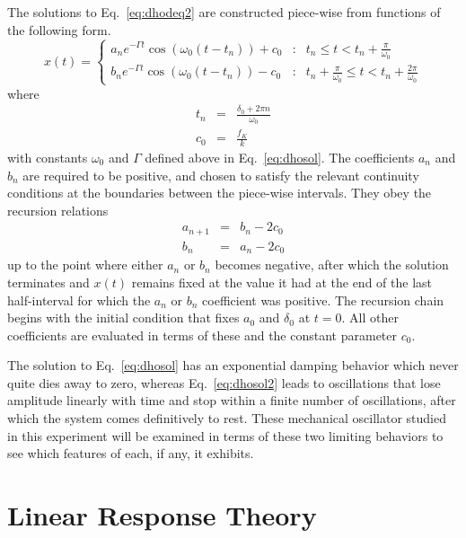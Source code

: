 \documentclass{revtex4}
\begin{document}
The solutions to Eq.~\ref{eq:dhodeq2} are constructed piece-wise from 
functions of the following form.
\begin{equation}
x(t)=\left\{\begin{array}{lll}
a_n e^{-\Gamma t} \cos\left(\omega_0 (t-t_n)\right) + c_0
&:& t_n\le t<t_n+\frac{\pi}{\omega_0} \\
b_n e^{-\Gamma t} \cos\left(\omega_0 (t-t_n)\right) - c_0
&:& t_n+\frac{\pi}{\omega_0}\le t
<t_n+\frac{2\pi}{\omega_0}
\end{array}\right.
\label{eq:dhosol2}
\end{equation}
where
\begin{eqnarray}
t_n&=&\frac{\delta_0+2\pi n}{\omega_0} \\
c_0&=&\frac{f_K}{k}
\end{eqnarray}
with constants $\omega_0$ and $\Gamma$ defined above in Eq.~\ref{eq:dhosol}.
The coefficients $a_n$ and $b_n$ are required to be positive, and chosen to
satisfy the relevant continuity conditions at the boundaries between the
piece-wise intervals.  They obey the recursion relations
\begin{eqnarray}
a_{n+1}&=&b_n-2c_0 \nonumber\\
b_n&=&a_n-2c_0
\end{eqnarray}
up to the point where either $a_n$ or $b_n$ becomes negative, after which
the solution terminates and $x(t)$ remains fixed at the value it had at
the end of the last half-interval for which the $a_n$ or $b_n$ coefficient
was positive.  The recursion chain begins with the initial condition
that fixes $a_0$ and $\delta_0$ at $t=0$.  All other coefficients
are evaluated in terms of these and the constant parameter $c_0$.

The solution to Eq.~\ref{eq:dhosol} has an exponential damping behavior
which never quite dies away to zero, whereas Eq.~\ref{eq:dhosol2} leads
to oscillations that lose amplitude linearly with time and stop within
a finite number of oscillations, after which the system comes definitively
to rest.  These mechanical oscillator studied in this experiment
will be examined in terms of these two limiting behaviors to see which
features of each, if any, it exhibits.

\section{Linear Response Theory}
\end{document}
